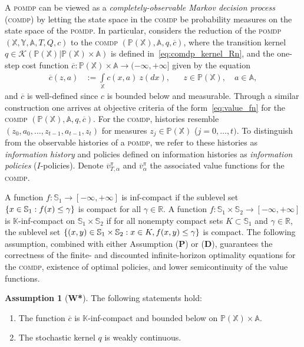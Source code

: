 \documentclass[11pt,onecolumn]{IEEEtran}  %
\newcommand{\Ab}{\mathbb{A}}
\newcommand{\Kb}{\mathbb{K}}
\newcommand{\Pb}{\mathbb{P}}
\newcommand{\Rb}{\mathbb{R}}
\newcommand{\Sb}{\mathbb{S}}
\newcommand{\Xb}{\mathbb{X}}
\newcommand{\Yb}{\mathbb{Y}}
\newcommand{\Kc}{\mathcal{K}}
\renewcommand{\bar}{\overline}
\newcommand{\defeq}{:=}%
\newcommand{\pomdp}{\textsc{pomdp}}
\newcommand{\comdp}{\textsc{comdp}}
\DeclarePairedDelimiter{\set}{\{}{\}}
\theoremstyle{definition}
\newtheorem*{assumption*}{Assumption}
\begin{document}
A \pomdp{} can be viewed as a \emph{completely-observable Markov decision process} (\comdp{}) by letting the state space in the \comdp{} be probability measures on the state space of the \pomdp{}. In particular, \citet{feinberg_partially_2016} considers the reduction of the \pomdp{} $(\Xb, \Yb, \Ab, T, Q, c)$ to the \comdp{} $(\Pb(\Xb), \Ab, q, \bar c)$, where the transition kernel $q \in \Kc(\Pb(\Xb)|\Pb(\Xb) \times\Ab)$ is defined in~\eqref{eq:comdp_kernel_Rn}, and the one-step cost function $\bar{c}: \Pb(\Xb) \times \Ab \to (-\infty, +\infty]$ given by the equation
\begin{align}
    \overline{c}(z,a) &\defeq
    \int\limits_{\Xb}c(x,a) \ z(dx), &&
    z \in \Pb(\Xb), \quad
    a \in \Ab,
\end{align}
and $\bar c$ is well-defined since $c$ is bounded below and measurable. Through a similar construction one arrives at objective criteria of the form~\eqref{eq:value_fn} for the \comdp{} $(\Pb(\Xb), \Ab, q, \bar c)$. For the \comdp{}, histories resemble $(z_0, a_0, \dots, z_{t-1}, a_{t-1}, z_t)$ for measures $z_j \in \Pb(\Xb)$ ($j=0,\dots, t)$. To distinguish from the observable histories of a \pomdp{}, we refer to these histories as \emph{information history} and policies defined on information histories as \emph{information policies} ($I$-policies). Denote $\bar{v}_{T,\alpha}^\pi$ and $\bar{v}_{\alpha}^\pi$ the associated value functions for the \comdp{}.


A function $f : \Sb_1 \to [-\infty, +\infty]$ is inf-compact if the sublevel set $\set{x \in \Sb_1: f(x) \leq \gamma}$ is compact for all $\gamma \in \Rb$. A function $f : \Sb_1 \times \Sb_2 \to [-\infty,+\infty]$ is $\Kb$-inf-compact on $\Sb_1 \times \Sb_2$ if for all nonempty compact sets $K \subset \Sb_1$ and $\gamma \in \Rb$, the sublevel set $\set{(x,y) \in \Sb_1 \times \Sb_2 : x \in K, f(x,y) \leq \gamma}$ is compact.  The following assumption, combined with either Assumption (\textbf{P}) or (\textbf{D}), guarantees the correctness of the finite- and discounted infinite-horizon optimality equations for the \comdp{}, existence of optimal policies, and lower semicontinuity of the value functions.
\begin{assumption*}[\textbf{W*}]
    The following statements hold:
    \begin{enumerate}
        \item The function $\bar c$ is $\Kb$-inf-compact and bounded below on $\Pb(\Xb) \times \Ab$.
        \item The stochastic kernel $q$ is weakly continuous.
    \end{enumerate}
\end{assumption*}
\end{document}
